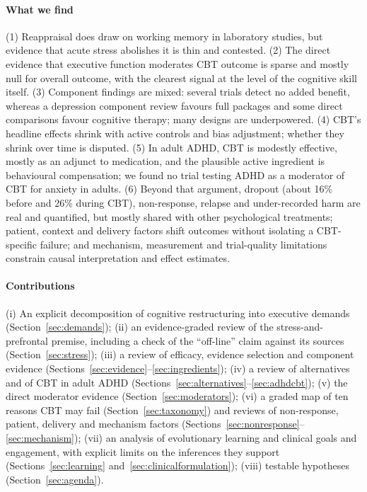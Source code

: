 \paragraph{What we find} (1) Reappraisal does draw on working memory in laboratory studies, but evidence that acute stress abolishes it is thin and contested.
(2) The direct evidence that executive function moderates CBT outcome is sparse and mostly null for overall outcome, with the clearest signal at the level of the cognitive skill itself.
(3) Component findings are mixed: several trials detect no added benefit, whereas a depression component review favours full packages and some direct comparisons favour cognitive therapy; many designs are underpowered.
(4) CBT's headline effects shrink with active controls and bias adjustment; whether they shrink over time is disputed.
(5) In adult ADHD, CBT is modestly effective, mostly as an adjunct to medication, and the plausible active ingredient is behavioural compensation; we found no trial testing ADHD as a moderator of CBT for anxiety in adults.
(6) Beyond that argument, dropout (about 16\% before and 26\% during CBT), non-response, relapse and under-recorded harm are real and quantified, but mostly shared with other psychological treatments; patient, context and delivery factors shift outcomes without isolating a CBT-specific failure; and mechanism, measurement and trial-quality limitations constrain causal interpretation and effect estimates.

\paragraph{Contributions} (i) An explicit decomposition of cognitive restructuring into executive demands (Section~\ref{sec:demands}); (ii) an evidence-graded review of the stress-and-prefrontal premise, including a check of the ``off-line'' claim against its sources (Section~\ref{sec:stress}); (iii) a review of efficacy, evidence selection and component evidence (Sections~\ref{sec:evidence}--\ref{sec:ingredients}); (iv) a review of alternatives and of CBT in adult ADHD (Sections~\ref{sec:alternatives}--\ref{sec:adhdcbt}); (v) the direct moderator evidence (Section~\ref{sec:moderators}); (vi) a graded map of ten reasons CBT may fail (Section~\ref{sec:taxonomy}) and reviews of non-response, patient, delivery and mechanism factors (Sections~\ref{sec:nonresponse}--\ref{sec:mechanism}); (vii) an analysis of evolutionary learning and clinical goals and engagement, with explicit limits on the inferences they support (Sections~\ref{sec:learning} and~\ref{sec:clinicalformulation}); (viii) testable hypotheses (Section~\ref{sec:agenda}).
